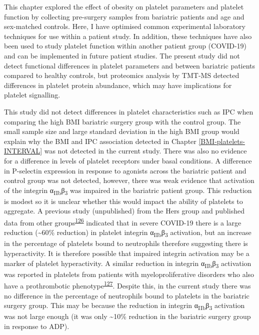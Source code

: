 \documentclass[11pt,twoside]{bristolthesis}
\begin{document}
This chapter explored the effect of obesity on platelet parameters and platelet function by collecting pre-surgery samples from bariatric patients and age and sex-matched controls. Here, I have optimised common experimental laboratory techniques for use within a patient study. In addition, these techniques have also been used to study platelet function within another patient group (COVID-19) and can be implemented in future patient studies. The present study did not detect functional differences in platelet parameters and between bariatric patients compared to healthy controls, but proteomics analysis by TMT-MS detected differences in platelet protein abundance, which may have implications for platelet signalling.

This study did not detect differences in platelet characteristics such as IPC when comparing the high BMI bariatric surgery group with the control group. The small sample size and large standard deviation in the high BMI group would explain why the BMI and IPC association detected in Chapter \ref{BMI-platelets-INTERVAL} was not detected in the current study. There was also no evidence for a difference in levels of platelet receptors under basal conditions. A difference in P-selectin expression in response to agonists across the bariatric patient and control group was not detected, however, there was weak evidence that activation of the integrin α\textsubscript{IIb}β\textsubscript{3} was impaired in the bariatric patient group. This reduction is modest so it is unclear whether this would impact the ability of platelets to aggregate. A previous study (unpublished) from the Hers group and published data from other groups\textsuperscript{\protect\hyperlink{ref-Taus2020}{126}} indicated that in severe COVID-19 there is a large reduction (\textasciitilde60\% reduction) in platelet integrin α\textsubscript{IIb}β\textsubscript{3} activation, but an increase in the percentage of platelets bound to neutrophils therefore suggesting there is hyperactivity. It is therefore possible that impaired integrin activation may be a marker of platelet hyperactivity. A similar reduction in integrin α\textsubscript{IIb}β\textsubscript{3} activation was reported in platelets from patients with myeloproliferative disorders who also have a prothrombotic phenotype\textsuperscript{\protect\hyperlink{ref-Moore2013}{127}}. Despite this, in the current study there was no difference in the percentage of neutrophils bound to platelets in the bariatric surgery group. This may be because the reduction in integrin α\textsubscript{IIb}β\textsubscript{3} activation was not large enough (it was only \textasciitilde10\% reduction in the bariatric surgery group in response to ADP).
\end{document}
